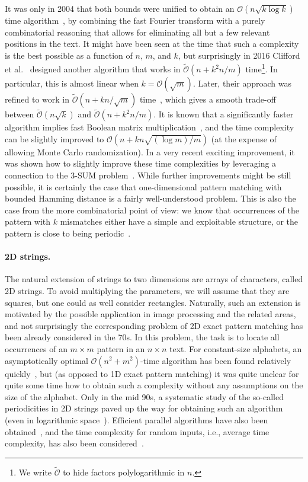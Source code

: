 \documentclass[a4paper,11pt]{article}
\renewcommand{\O}{\mathcal{O}}
\newcommand{\tO}{\tilde{\mathcal{O}}}
\begin{document}
It was only in 2004 that both bounds were unified to obtain an $\O(n\sqrt{k \log k})$ time algorithm~\cite{Amir2004},
by combining the fast Fourier transform with a purely combinatorial reasoning that allows for eliminating all but a few relevant positions
in the text. It might have been seen at the time that such a complexity is the best possible as a function of $n$, $m$, and $k$,
but surprisingly in 2016 Clifford et al.~\cite{Clifford2016a} designed another algorithm that works
in $\tO(n + k^2n/m)$ time\footnote{We write $\tO$ to hide factors polylogarithmic in $n$.}. In particular, this is almost linear when $k=\O(\sqrt{m})$. Later, their
approach was refined to work in $\tO(n + kn/\sqrt{m})$ time~\cite{Gawrychowski2018},
which gives a smooth trade-off between $\tO(n\sqrt{k})$ and $\tO(n + k^2n/m)$. 
It is known that a significantly faster algorithm implies fast Boolean matrix multiplication~\cite{Gawrychowski2018},
and the time complexity can be slightly improved to $\O(n + kn\sqrt{(\log m) / m})$ \cite{Chan2020} (at the expense
of allowing Monte Carlo randomization). In a very recent exciting improvement, it was shown how to slightly improve
these time complexities by leveraging a connection to the 3-SUM problem~\cite{Chan0WX23}.
While further improvements might be still possible, it is certainly the case that one-dimensional pattern matching with
bounded Hamming distance is a fairly well-understood problem.
This is also the case from the more combinatorial point of view: we know that occurrences of the pattern with $k$ mismatches
either have a simple and exploitable structure, or the pattern is close to being periodic~\cite{Bringmann2019,Charalampopoulos2020a}.

\paragraph{2D strings.} The natural extension of strings to two dimensions are arrays of characters, called 2D strings. 
To avoid multiplying the parameters, we will assume that they are squares, but one could as well consider rectangles.
Naturally, such an extension is motivated by the possible application in image processing and the related areas,
and not surprisingly the corresponding problem of 2D exact pattern matching has been already considered in the 70s.
In this problem, the task is to locate all occurrences of an $m\times m$ pattern in an $n\times n$ text.
For constant-size alphabets, an asymptotically optimal $\O(n^{2}+m^{2})$-time algorithm has been found relatively
quickly~\cite{AMIR1992233,AMIR19922,BIRD1977168,doi:10.1137/0207043}, but (as opposed to 1D exact pattern matching) it was quite unclear for quite some time how to obtain
such a complexity without any assumptions on the size of the alphabet. Only in the mid 90s, a systematic
study of the so-called periodicities in 2D strings paved up the way for obtaining such an algorithm~\cite{Amir1994,Galil1996}
(even in logarithmic space~\cite{Crochemore1995}). Efficient parallel algorithms have also been obtained~\cite{Crochemore1998},
and the time complexity for random inputs, i.e., average time complexity, has also been considered~\cite{Baeza-Yates1993,Tarhio1996,Kaerkkaeinen1999}.
\end{document}
